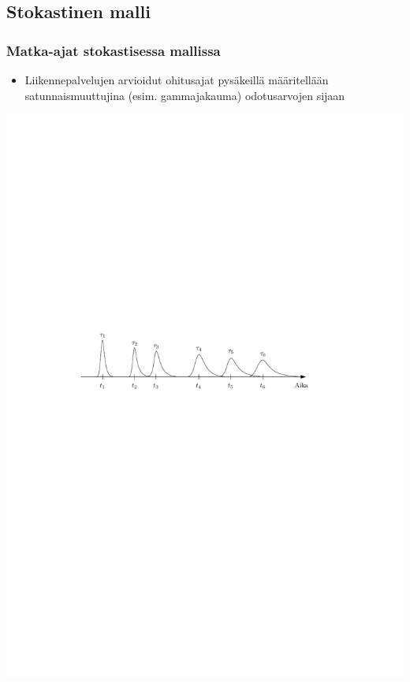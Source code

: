 \documentclass{beamer}
\begin{document}
\subsection{Stokastinen malli}
\begin{frame}
  \frametitle{Matka-ajat stokastisessa mallissa} 
  \begin{itemize}
   \item 
    Liikennepalvelujen arvioidut ohitusajat pysäkeillä määritellään satunnaismuuttujina (esim. gammajakauma) odotusarvojen sijaan
\end{itemize}
     \begin{center}
     \includegraphics[scale=0.7]{stokvsdet02}
      \end{center}
    \end{frame} 
    
\end{document}
